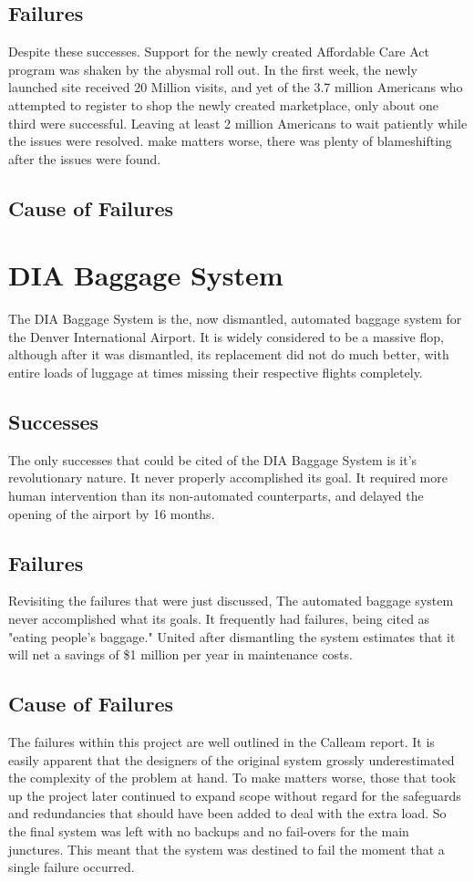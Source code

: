 \documentclass[conference]{IEEEtran}
\begin{document}
	\subsection{Failures}
	Despite these successes. Support for the newly created Affordable Care Act program was shaken by the abysmal roll out. In the first week, the newly launched site received 20 Million visits, and yet of the 3.7 million Americans who attempted to register to shop the newly created marketplace, only about one third were successful. Leaving at least 2 million Americans to wait patiently while the issues were resolved. \cite{hc_informationweek}  make matters worse, there was plenty of blameshifting after the issues were found. 
	\subsection{Cause of Failures}

\section{DIA Baggage System}
	The DIA Baggage System is the, now dismantled, automated baggage system for the Denver International Airport. It is widely considered to be a massive flop, although after it was dismantled, its replacement did not do much better, with entire loads of luggage at times missing their respective flights completely. \cite{dia_denverpost} 
	\subsection{Successes}
		The only successes that could be cited of the DIA Baggage System is it's revolutionary nature. It never properly accomplished its goal. It required more human intervention than its non-automated counterparts, and delayed the opening of the airport by 16 months.
	\subsection{Failures}
		Revisiting the failures that were just discussed, The automated baggage system never accomplished what its goals. It frequently had failures, being cited as "eating people's baggage."\cite{dia_calleam} United after dismantling the system estimates that it will net a savings of \$1 million per year in maintenance costs.\cite{dia_nbc} 
	\subsection{Cause of Failures}
		The failures within this project are well outlined in the Calleam report. It is easily apparent that the designers of the original system grossly underestimated the complexity of the problem at hand. To make matters worse, those that took up the project later continued to expand scope without regard for the safeguards and redundancies that should have been added to deal with the extra load. So the final system was left with no backups and no fail-overs for the main junctures. This meant that the system was destined to fail the moment that a single failure occurred. \cite{dia_calleam}
\end{document}
